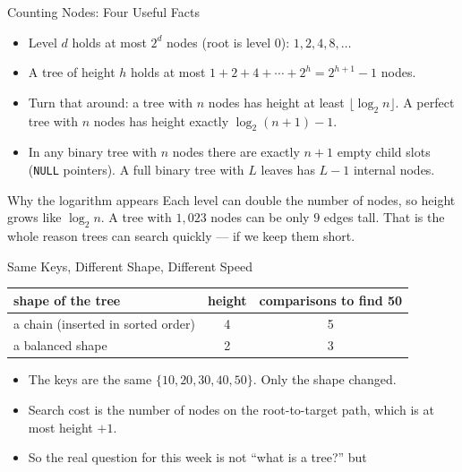 \documentclass[aspectratio=169]{beamer}
\begin{document}
\begin{frame}{Counting Nodes: Four Useful Facts}
  \begin{itemize}
    \item Level $d$ holds at most $2^d$ nodes (root is level $0$):
      $1, 2, 4, 8, \dots$
    \item A tree of height $h$ holds at most
      $1 + 2 + 4 + \cdots + 2^h = 2^{h+1} - 1$ nodes.
    \item Turn that around: a tree with $n$ nodes has height at least
      $\lfloor \log_2 n \rfloor$. A perfect tree with $n$ nodes has height
      exactly $\log_2(n+1) - 1$.
    \item In any binary tree with $n$ nodes there are exactly $n+1$ empty
      child slots (\texttt{NULL} pointers). A full binary tree with $L$
      leaves has $L-1$ internal nodes.
  \end{itemize}
  \begin{exampleblock}{Why the logarithm appears}
    Each level can double the number of nodes, so height grows like
    $\log_2 n$. A tree with $1{,}023$ nodes can be only $9$ edges tall.
    That is the whole reason trees can search quickly --- if we keep them
    short.
  \end{exampleblock}
\end{frame}

\begin{frame}{Same Keys, Different Shape, Different Speed}
  \begin{center}
  {\footnotesize
  \begin{tabular}{l c c}
    \toprule
    \textbf{shape of the tree} & \textbf{height} & \textbf{comparisons to find 50} \\
    \midrule
    a chain (inserted in sorted order) & 4 & 5 \\
    a balanced shape & 2 & 3 \\
    \bottomrule
  \end{tabular}}
  \end{center}
  \begin{itemize}
    \item The keys are the same $\{10,20,30,40,50\}$. Only the shape changed.
    \item Search cost is the number of nodes on the root-to-target path,
      which is at most height $+1$.
    \item So the real question for this week is not ``what is a tree?'' but
  \end{itemize}
\end{frame}
\end{document}
